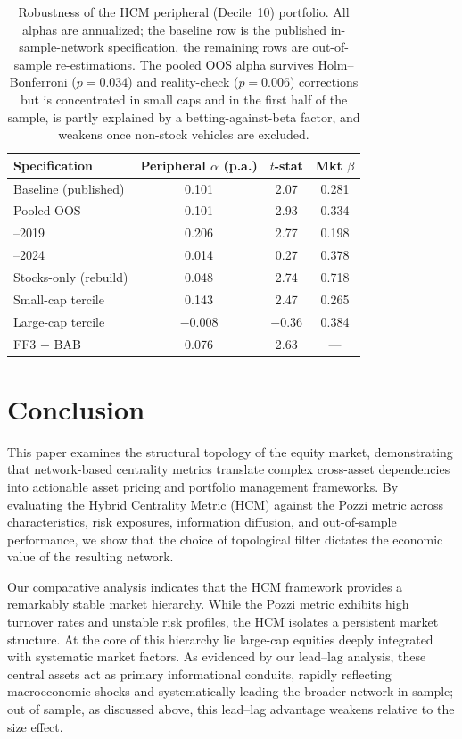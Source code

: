 \documentclass[fleqn]{rbfin}
\begin{document}
\begin{table}[!htbp]
    \caption{Robustness of the HCM peripheral (Decile~10) portfolio. All alphas are annualized; the baseline row is the published in-sample-network specification, the remaining rows are out-of-sample re-estimations. The pooled OOS alpha survives Holm--Bonferroni ($p=0.034$) and reality-check ($p=0.006$) corrections but is concentrated in small caps and in the first half of the sample, is partly explained by a betting-against-beta factor, and weakens once non-stock vehicles are excluded.}
    \label{tab:robustness}
    \centering
    \begin{tabular}{lccc}
    \toprule
    Specification & Peripheral $\alpha$ (p.a.) & $t$-stat & Mkt $\beta$ \\
    \midrule
    Baseline (published)          & 0.101 & 2.07 & 0.281 \\
    Pooled OOS                    & 0.101 & 2.93 & 0.334 \\
    \quad 2015--2019              & 0.206 & 2.77 & 0.198 \\
    \quad 2020--2024              & 0.014 & 0.27 & 0.378 \\
    Stocks-only (rebuild)         & 0.048 & 2.74 & 0.718 \\
    Small-cap tercile             & 0.143 & 2.47 & 0.265 \\
    Large-cap tercile             & $-0.008$ & $-0.36$ & 0.384 \\
    FF3 $+$ BAB                   & 0.076 & 2.63 & --- \\
    \bottomrule
    \end{tabular}
\end{table}

\section{Conclusion}\label{sec:conclusion}

\noindent This paper examines the structural topology of the equity market, demonstrating that network-based centrality metrics translate complex cross-asset dependencies into actionable asset pricing and portfolio management frameworks. By evaluating the Hybrid Centrality Metric (HCM) against the Pozzi metric across characteristics, risk exposures, information diffusion, and out-of-sample performance, we show that the choice of topological filter dictates the economic value of the resulting network. 

Our comparative analysis indicates that the HCM framework provides a remarkably stable market hierarchy. While the Pozzi metric exhibits high turnover rates and unstable risk profiles, the HCM isolates a persistent market structure. At the core of this hierarchy lie large-cap equities deeply integrated with systematic market factors. As evidenced by our lead--lag analysis, these central assets act as primary informational conduits, rapidly reflecting macroeconomic shocks and systematically leading the broader network in sample; out of sample, as discussed above, this lead--lag advantage weakens relative to the size effect.
\end{document}
